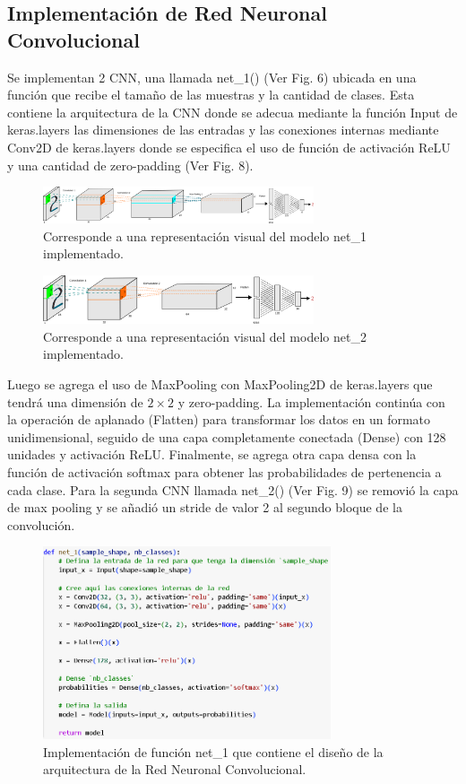\documentclass[journal]{IEEEtai}
\begin{document}
\subsection{Implementación de Red Neuronal Convolucional}

Se implementan  2 CNN, una llamada net\_1() (Ver Fig. 6) ubicada en una función que recibe el tamaño de las muestras y la cantidad de clases. Esta contiene la arquitectura de la CNN donde se adecua mediante la función Input de keras.layers las dimensiones de las entradas y las conexiones internas mediante Conv2D de keras.layers donde se especifica el uso de función de activación ReLU y una cantidad de zero-padding (Ver Fig. 8).


\begin{figure}[h!]
\centering
\includegraphics[width=8cm]{img/net1.png}
\caption{Corresponde a una representación visual del modelo net\_1 implementado.}
\label{fig: net1}
\end{figure}

\begin{figure}[h!]
\centering
\includegraphics[width=8cm]{img/net2.png}
\caption{Corresponde a una representación visual del modelo net\_2 implementado.}
\label{fig: net2}
\end{figure}


Luego se agrega el uso de MaxPooling con MaxPooling2D de keras.layers que tendrá una dimensión de $2 \times 2$ y zero-padding. La implementación continúa con la operación de aplanado (Flatten) para transformar los datos en un formato unidimensional, seguido de una capa completamente conectada (Dense) con 128 unidades y activación ReLU. Finalmente, se agrega otra capa densa con la función de activación softmax para obtener las probabilidades de pertenencia a cada clase.
Para la segunda CNN llamada net\_2() (Ver Fig. 9) se removió la capa de max pooling y se añadió un stride de valor 2 al segundo bloque de la convolución.

\begin{figure}[h!]
\centering
\includegraphics[width=8.5cm]{img/codenet1.png}
\caption{Implementación de función net\_1 que contiene el diseño de la arquitectura de la Red Neuronal Convolucional.}
\label{fig: codenet1}
\end{figure}
\end{document}
